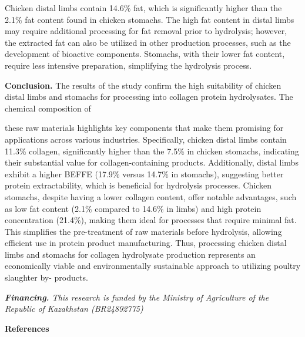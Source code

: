 \begin{multicols}{2}
Chicken distal limbs contain 14.6\% fat, which is significantly higher
than the 2.1\% fat content found in chicken stomachs. The high fat
content in distal limbs may require additional processing for fat
removal prior to hydrolysis; however, the extracted fat can also be
utilized in other production processes, such as the development of
bioactive components. Stomachs, with their lower fat content, require
less intensive preparation, simplifying the hydrolysis process.

{\bfseries Conclusion.} The results of the study confirm the high
suitability of chicken distal limbs and stomachs for processing into
collagen protein hydrolysates. The chemical composition of

these raw materials highlights key components that make them promising
for applications across various industries. Specifically, chicken distal
limbs contain 11.3\% collagen, significantly higher than the 7.5\% in
chicken stomachs, indicating their substantial value for
collagen-containing products. Additionally, distal limbs exhibit a
higher BEFFE (17.9\% versus 14.7\% in stomachs), suggesting better
protein extractability, which is beneficial for hydrolysis processes.
Chicken stomachs, despite having a lower collagen content, offer notable
advantages, such as low fat content (2.1\% compared to 14.6\% in limbs)
and high protein concentration (21.4\%), making them ideal for processes
that require minimal fat. This simplifies the pre-treatment of raw
materials before hydrolysis, allowing efficient use in protein product
manufacturing. Thus, processing chicken distal limbs and stomachs for
collagen hydrolysate production represents an economically viable and
environmentally sustainable approach to utilizing poultry slaughter by-
products.

\emph{{\bfseries Financing.} This research is funded by the Ministry of
Agriculture of the Republic of Kazakhstan (BR24892775)}
\end{multicols}

\begin{center}
{\bfseries References}
\end{center}

